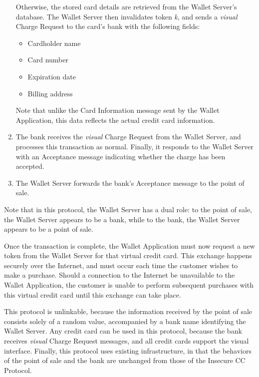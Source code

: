 \begin{enumerate}
    Otherwise, the stored card details are retrieved from the Wallet Server's database.
    The Wallet Server then invalidates token \emph{k}, and sends a \emph{visual} Charge Request to the card's bank with the following fields:
    \begin{itemize}
    \item Cardholder name
    \item Card number
    \item Expiration date
    \item Billing address
    \end{itemize}
    Note that unlike the Card Information message sent by the Wallet Application, this data reflects the actual credit card information.
\item The bank receives the \emph{visual} Charge Request from the Wallet Server,
    and processes this transaction as normal.
    Finally, it responds to the Wallet Server with an Acceptance message indicating whether the charge has been accepted.
\item The Wallet Server forwards the bank's Acceptance message to the point of sale.
\end{enumerate}

Note that in this protocol, the Wallet Server has a dual role:
to the point of sale, the Wallet Server appears to be a bank, while to the bank, the Wallet Server appears to be a point of sale.

Once the transaction is complete, the Wallet Application must now request a new token from the Wallet Server for that virtual credit card.
This exchange happens securely over the Internet, and must occur each time the customer wishes to make a purchase.
Should a connection to the Internet be unavailable to the Wallet Application,
    the customer is unable to perform subsequent purchases with this virtual credit card until this exchange can take place.

This protocol is unlinkable,
    because the information received by the point of sale consists solely of a random value, accompanied by a bank name identifying the Wallet Server.
Any credit card can be used in this protocol,
    because the bank receives \emph{visual} Charge Request messages, and all credit cards support the visual interface.
Finally, this protocol uses existing infrastructure,
    in that the behaviors of the point of sale and the bank are unchanged from those of the Insecure CC Protocol.
